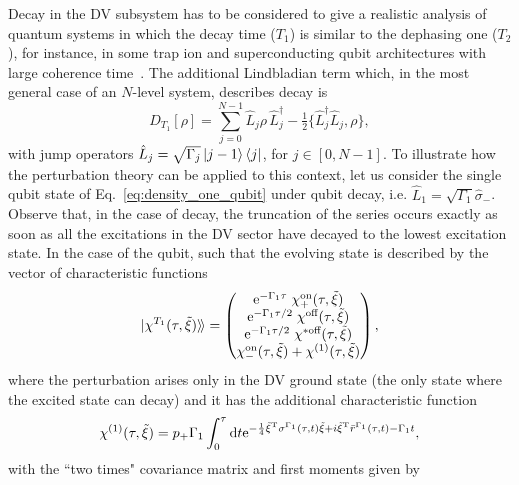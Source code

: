 \documentclass[%
reprint,
superscriptaddress,
nofootinbib,
 amsmath,amssymb,
prx,
floatfix,
]{revtex4-2}
\newcommand{\dket}[1]{\lvert #1 \rangle\!\rangle}
\begin{document}
Decay in the DV subsystem has to be considered to give a realistic analysis of quantum systems in which the decay time ($T_1$) is similar to the dephasing one  ($T_2$), for instance, in some trap ion and superconducting qubit architectures with large coherence time~\cite{Wang2021,bland20252dtransmonslifetimescoherence}. The additional Lindbladian term which, in the most general case of an $N$-level system, describes decay is  
\begin{equation}
\label{eq:Nlevel_lindblad}
    D_{T_1} [\rho] = \sum_{j=0}^{N-1} \hat{L}_j \rho\, \hat{L}_j^\dagger - \tfrac{1}{2} \{ \hat{L}_j^\dagger \hat{L}_j, \rho \}, 
\end{equation}
with jump operators $\hat{L}_{j} = \sqrt{\Gamma_{j}} \ket{j-1}\bra{j}$, for $j \in [0,N-1]$. To illustrate how the perturbation theory can be applied to this context, let us consider the single qubit state of Eq.~\ref{eq:density_one_qubit} under qubit decay, i.e.  $\hat{L}_{1} = \sqrt{\Gamma_{1}} \hat{\sigma}_-$. Observe that, in the case of decay, the truncation of the series occurs exactly as soon as all the excitations in the DV sector have decayed to the lowest excitation state.  In the case of the qubit,  such that the evolving state is described by the vector of characteristic functions
\begin{equation}
    \dket{\chi^{T_1} (\tau, \tilde{\xi})} = \begin{pmatrix}
        {\rm e}^{-\Gamma_{1}\tau  } \; \chi^{\text{on}}_+ (\tau, \tilde{\xi})    \\
{\rm e}^{-\Gamma_{1}\tau  /2 }\; \chi^{\text{off}}  (\tau, \tilde{\xi})  \\
{\rm e}^{-\Gamma_{1}\tau /2 } \;\chi^{* \text{off}} (\tau, \tilde{\xi})    \\
\chi^{\text{on}}_- (\tau, \tilde{\xi})   + \chi^{(1)}  (\tau, \tilde{\xi})
    \end{pmatrix}  ,
\end{equation} 
where the perturbation arises only in the DV ground state  (the only state where the excited state can decay) and it has the additional characteristic function
\begin{equation}
\label{eq:decay_qubit}
    \chi^{(1) } (\tau, \tilde{\xi})  =  p_+ \Gamma_1 \int_0^{\tau}  {\rm d} t {\rm e}^{-\frac{1}{4} \tilde{\xi}^{\rm T} \sigma^{\Gamma_1} ( \tau, t) \tilde{\xi}  +  i  \tilde{\xi}^{\rm T} \bar{r}^{\Gamma_1} ( \tau, t) - \Gamma_1 t } ,
\end{equation}
with the ``two times" covariance matrix and first moments given by
\end{document}
